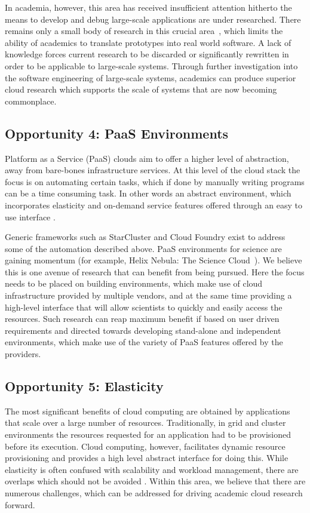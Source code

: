 \documentclass[letterpaper,twocolumn,10pt]{article}
\begin{document}
In academia, however, this area has received 
insufficient attention hitherto the means to develop and debug large-scale applications
are under researched. There remains only a small body of research in this crucial
area~\cite{Zhou:2013:WAD:2493123.2462907, Chilimbi:2009:HES:1555001.1555020}, which limits the ability of academics to translate prototypes into real world
software. A lack of knowledge forces current research to be discarded
or significantly rewritten in order to be applicable to large-scale systems. Through
further investigation into the software engineering of large-scale systems, academics 
can produce superior cloud research which supports the scale of systems that are
now becoming commonplace.


\subsection*{Opportunity 4: PaaS Environments}
Platform as a Service (PaaS) clouds aim to offer a higher level of abstraction, away from bare-bones infrastructure services. At this level of the cloud stack the focus is on automating certain tasks, which if done by manually writing programs can be a time consuming task. In other words an abstract environment, which incorporates elasticity and on-demand service features offered through an easy to use interface \cite{paas-1, paas-3}.  



Generic frameworks such as StarCluster \cite{StarCluster} and Cloud Foundry \cite{cloudfoundry} exist to address some of the automation described above. PaaS environments for science are gaining momentum (for example, Helix Nebula: The Science Cloud~\cite{helix}). We believe this is one avenue of research that can benefit from being pursued. Here the focus needs to be placed on building environments, which make use of cloud infrastructure provided by multiple vendors, and at the same time providing a high-level interface that will allow scientists to quickly and easily access the resources. Such research can reap maximum benefit if based on user driven requirements and directed towards developing stand-alone and independent environments, which make use of the variety of PaaS features offered by the providers.


\subsection*{Opportunity 5: Elasticity}
The most significant benefits of cloud computing are obtained by applications that scale over a large number of resources. Traditionally, in grid and cluster environments the resources requested for an application had to be provisioned before its execution. Cloud computing, however, facilitates dynamic resource provisioning and provides a high level abstract interface for doing this. While elasticity is often confused with scalability and workload management, there are overlaps which should not be avoided \cite{elasticity-1}. Within this area, we believe that there are numerous challenges, which can be addressed for driving academic cloud research forward. 
\end{document}
